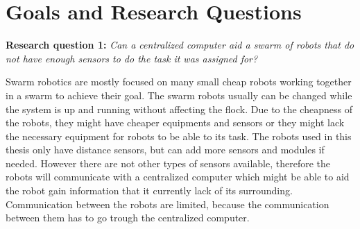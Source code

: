 

\section{Goals and Research Questions}
\label{sec:Goals and Research Questions}

%
%
%



\textbf{Research question 1:} {\it Can a centralized computer aid a swarm of robots that do not have enough sensors to do the task it was assigned for?}

Swarm robotics are mostly focused on many small cheap robots working together in a swarm to achieve their goal. The swarm robots usually can be changed while the system is up and running without affecting the flock.
Due to the cheapness of the robots, they might have cheaper equipments and sensors or they might lack the necessary equipment for robots to be able to its task. 
The robots used in this thesis only have distance sensors, but can add more sensors and modules if needed. However there are not other types of sensors available, therefore the robots will communicate with a centralized computer which might be able to aid the robot gain information that it currently lack of its surrounding.
Communication between the robots are limited, because the communication between them has to go trough the centralized computer.


